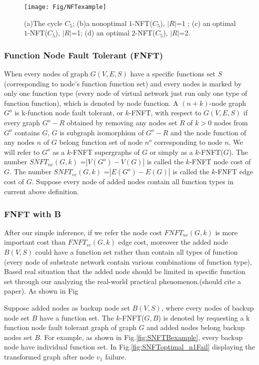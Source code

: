\begin{figure}
  \centering
  \texttt{[image: Fig/NFTexample]}\\
  \caption{(a)The cycle $C_5$; (b)a nonoptimal $1$-NFT($C_5$), $|R|$=1 ; (c) an optimal $1$-NFT($C_5$), $|R|$=1; (d) an optimal $2$-NFT($C_5$), $|R|$=2. }\label{fig:NFTexample}
\end{figure}

\subsubsection{Function Node Fault Tolerant (FNFT)}
When every nodes of graph $G(V,E,S)$ have a specific functions set $S$ (corresponding to node's function function set) and every nodes is marked by only one function type (every node of virtual network just run only one type of function function), which is denoted by node function. A $(n+k)$-node graph $G^o$ is k-function node fault tolerant, or $k$-FNFT, with respect to $G(V,E,S)$ if every graph $G^o-R$ obtained by removing any nodes set $R$ of $k>0$ nodes from $G^o$ contains $G$, $G$ is subgraph isomorphism of $G^o-R$ and the node function of any nodes $n$ of $G$ belong function set of node $n^o$ corresponding to node $n$. We will refer to $G^o$ as a $k$-FNFT supergraphs of $G$ or simply as a $k$-FNFT($G$). The number $SNFT_{nc}$$(G,k)$ =$|V(G^o)-V(G)|$ is called the $k$-FNFT node cost of $G$. The number $SNFT_{ec}$$(G,k)$ =$|E(G^o)-E(G)|$ is called the $k$-FNFT edge cost of $G$. Suppose every node of added nodes contain all function types in current above definition.
\subsubsection{FNFT with B}
After our simple inference, if we refer the node cost $FNFT_{nc}(G,k)$  is more important cost than $FNFT_{ec}(G,k)$  edge cost, moreover the added node $B(V,S)$ could have a function set rather than contain all types of function (every node of substrate network contain various combinations of function type), Based real situation that the added node should be limited in specific function set through our analyzing the real-world practical phenomenon.(should cite a paper).
 As shown in Fig

Suppose added nodes as backup node set $B(V,S)$, where every nodes of backup node set $B$ have a function set. The $k$-FNFT($G,B$) is denoted by requesting a k function node fault tolerant graph of graph $G$ and added nodes belong backup nodes set $B$. For example, as shown in Fig.\ref{fig:SNFTBexample}, every backup node have individual function set. In Fig.\ref{fig:SNFToptimal_n1Fail} displaying the transformed graph after node $v_1$ failure.

